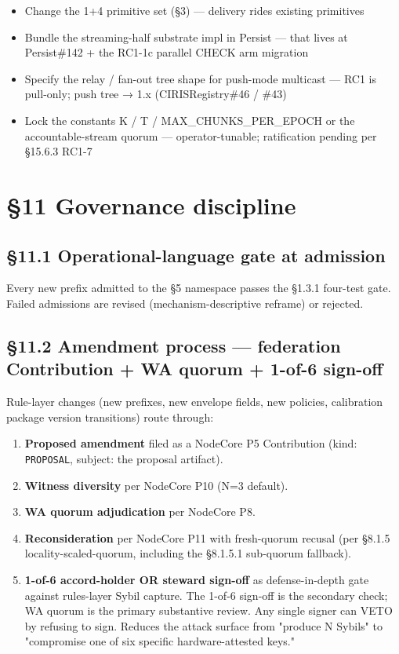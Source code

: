 \documentclass[10pt]{article}
\begin{document}
\begin{itemize}\setlength\itemsep{0pt}
\item Change the 1+4 primitive set (§3) — delivery rides existing primitives
\item Bundle the streaming-half substrate impl in Persist — that lives at Persist\#142 + the RC1-1c parallel CHECK arm migration
\item Specify the relay / fan-out tree shape for push-mode multicast — RC1 is pull-only; push tree → 1.x (CIRISRegistry\#46 / \#43)
\item Lock the constants K / T / MAX\_CHUNKS\_PER\_EPOCH or the accountable-stream quorum — operator-tunable; ratification pending per §15.6.3 RC1-7
\end{itemize}




\clearpage


\section*{§11 Governance discipline}


\subsection*{§11.1 Operational-language gate at admission}


Every new prefix admitted to the §5 namespace passes the §1.3.1 four-test gate. Failed admissions are revised (mechanism-descriptive reframe) or rejected.


\subsection*{§11.2 Amendment process — federation Contribution + WA quorum + 1-of-6 sign-off}


Rule-layer changes (new prefixes, new envelope fields, new policies, calibration package version transitions) route through:


\begin{enumerate}\setlength\itemsep{0pt}
\item \textbf{Proposed amendment} filed as a NodeCore P5 Contribution (kind: \texttt{PROPOSAL}, subject: the proposal artifact).
\item \textbf{Witness diversity} per NodeCore P10 (N=3 default).
\item \textbf{WA quorum adjudication} per NodeCore P8.
\item \textbf{Reconsideration} per NodeCore P11 with fresh-quorum recusal (per §8.1.5 locality-scaled-quorum, including the §8.1.5.1 sub-quorum fallback).
\item \textbf{1-of-6 accord-holder OR steward sign-off} as defense-in-depth gate against rules-layer Sybil capture. The 1-of-6 sign-off is the secondary check; WA quorum is the primary substantive review. Any single signer can VETO by refusing to sign. Reduces the attack surface from "produce N Sybils" to "compromise one of six specific hardware-attested keys."
\end{enumerate}
\end{document}
